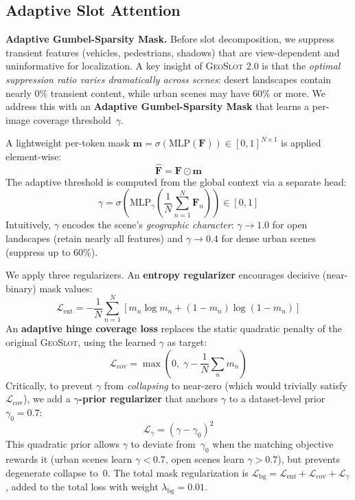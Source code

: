 \documentclass{article}
\newcommand{\ours}{\textsc{GeoSlot}}
\newcommand{\oursv}{\textsc{GeoSlot 2.0}}
\newcommand{\cL}{\mathcal{L}}
\begin{document}
\subsection{Adaptive Slot Attention}\label{sec:slots}

\textbf{Adaptive Gumbel-Sparsity Mask.}
Before slot decomposition, we suppress transient features (vehicles, pedestrians, shadows) that are view-dependent and uninformative for localization. A key insight of \oursv{} is that the \textit{optimal suppression ratio varies dramatically across scenes}: desert landscapes contain nearly 0\% transient content, while urban scenes may have 60\% or more. We address this with an \textbf{Adaptive Gumbel-Sparsity Mask} that learns a per-image coverage threshold~$\gamma$.

A lightweight per-token mask $\mathbf{m} = \sigma(\text{MLP}(\mathbf{F})) \in [0, 1]^{N \times 1}$ is applied element-wise:
\begin{equation}
    \hat{\mathbf{F}} = \mathbf{F} \odot \mathbf{m}
\end{equation}
The adaptive threshold is computed from the global context via a separate head:
\begin{equation}
    \gamma = \sigma\!\left(\text{MLP}_{\gamma}\!\left(\frac{1}{N}\sum_{n=1}^N \mathbf{F}_n\right)\right) \in [0, 1]
\end{equation}
Intuitively, $\gamma$ encodes the scene's \textit{geographic character}: $\gamma \to 1.0$ for open landscapes (retain nearly all features) and $\gamma \to 0.4$ for dense urban scenes (suppress up to 60\%).

We apply three regularizers. An \textbf{entropy regularizer} encourages decisive (near-binary) mask values:
\begin{equation}
    \cL_{\text{ent}} = -\frac{1}{N}\sum_{n=1}^N \left[m_n \log m_n + (1-m_n)\log(1-m_n)\right]
\end{equation}
An \textbf{adaptive hinge coverage loss} replaces the static quadratic penalty of the original \ours{}, using the learned $\gamma$ as target:
\begin{equation}
    \cL_{\text{cov}} = \max\!\left(0,\; \gamma - \frac{1}{N}\sum_n m_n\right)
\end{equation}
Critically, to prevent $\gamma$ from \textit{collapsing} to near-zero (which would trivially satisfy $\cL_{\text{cov}}$), we add a \textbf{$\gamma$-prior regularizer} that anchors $\gamma$ to a dataset-level prior $\gamma_0 = 0.7$:
\begin{equation}
    \cL_{\gamma} = (\gamma - \gamma_0)^2
\end{equation}
This quadratic prior allows $\gamma$ to deviate from~$\gamma_0$ when the matching objective rewards it (urban scenes learn $\gamma < 0.7$, open scenes learn $\gamma > 0.7$), but prevents degenerate collapse to~0. The total mask regularization is $\cL_{\text{bg}} = \cL_{\text{ent}} + \cL_{\text{cov}} + \cL_{\gamma}$, added to the total loss with weight $\lambda_{\text{bg}} = 0.01$.
\end{document}
